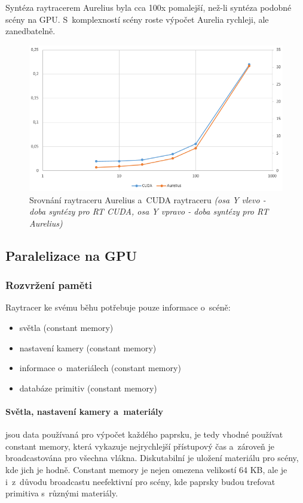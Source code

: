 \documentclass[12pt,a4paper,titlepage,final]{report}
\begin{document}
Syntéza raytracerem Aurelius byla cca 100x pomalejší, než-li syntéza podobné scény na GPU. S~komplexností scény roste výpočet Aurelia rychleji, ale zanedbatelně.


\begin{figure}
\begin{center}
\includegraphics[width=16cm]{images/srovnani.png}
\caption{Srovnání raytraceru Aurelius a~CUDA raytraceru \textit{(osa Y vlevo - doba syntézy pro RT CUDA, osa Y vpravo - doba syntézy pro RT Aurelius)}}
\end{center}
\end{figure}

\subsection{Paralelizace na GPU}

\subsubsection{Rozvržení paměti} 

Raytracer ke svému běhu potřebuje pouze informace o~scéně:
\begin{itemize}
	\item světla (constant memory)
	\item nastavení kamery (constant memory)
	\item informace o~materiálech (constant memory)
	\item databáze primitiv (constant memory)
\end{itemize}

\paragraph{Světla, nastavení kamery a~materiály} jsou data používaná pro výpočet každého paprsku, je tedy vhodné používat constant memory, která vykazuje nejrychlejší přístupový čas a~zároveň je broadcastována pro všechna vlákna. Diskutabilní je uložení materiálu pro scény, kde jich je hodně. Constant memory je nejen omezena velikostí 64 KB, ale je i~z~důvodu broadcastu neefektivní pro scény, kde paprsky budou trefovat primitiva s~různými materiály.
\end{document}
